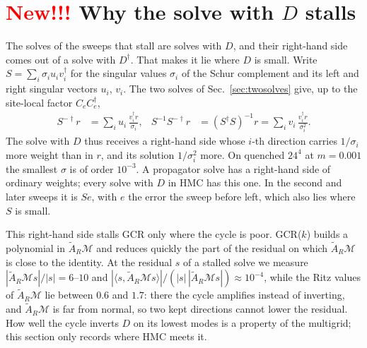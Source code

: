 \documentclass[11pt,a4paper]{article}
\numberwithin{equation}{section}
\newcommand{\dg}{^{\dagger}}
\newcommand{\AR}{\tilde A_{R}}
\newcommand{\Ce}{C_{e}}
\begin{document}
\section{\textcolor{red}{New!!!} Why the solve with $D$ stalls}\label{sec:stall}
The solves of the sweeps that stall are solves with $D$, and their right-hand side comes out of a
solve with $D\dg$. That makes it lie where $D$ is small. Write $S=\sum_i\sigma_iu_iv_i\dg$ for
the singular values $\sigma_i$ of the Schur complement and its left and right singular vectors
$u_i$, $v_i$. The two solves of Sec.~\ref{sec:twosolves} give, up to the site-local factor
$\Ce\Ce\dg$,
\begin{align}
S^{-\dagger}r&=\sum_iu_i\,\frac{v_i\dg r}{\sigma_i}, &
S^{-1}S^{-\dagger}r&=(S\dg S)^{-1}r=\sum_iv_i\,\frac{v_i\dg r}{\sigma_i^2}.
\end{align}
The solve with $D$ thus receives a right-hand side whose $i$-th direction carries $1/\sigma_i$
more weight than in $r$, and its solution $1/\sigma_i^2$ more. On quenched $24^4$ at $m=0.001$ the
smallest $\sigma$ is of order $10^{-3}$. A propagator solve has a right-hand side of ordinary
weights; every solve with $D$ in HMC has this one. In the second and later sweeps it is $Se$,
with $e$ the error the sweep before left, which also lies where $S$ is small.

This right-hand side stalls GCR only where the cycle is poor. GCR($k$) builds a polynomial in
$\AR\mathcal M$ and reduces quickly the part of the residual on which $\AR\mathcal M$ is close to
the identity. At the residual $s$ of a stalled solve we measure $|\AR\mathcal Ms|/|s|=6$--$10$ and
$|\langle s,\AR\mathcal Ms\rangle|/(|s|\,|\AR\mathcal Ms|)\approx10^{-4}$, while the Ritz values
of $\AR\mathcal M$ lie between $0.6$ and $1.7$: there the cycle amplifies instead of inverting,
and $\AR\mathcal M$ is far from normal, so two kept directions cannot lower the residual. How
well the cycle inverts $D$ on its lowest modes is a property of the multigrid; this section only
records where HMC meets it.
\end{document}
